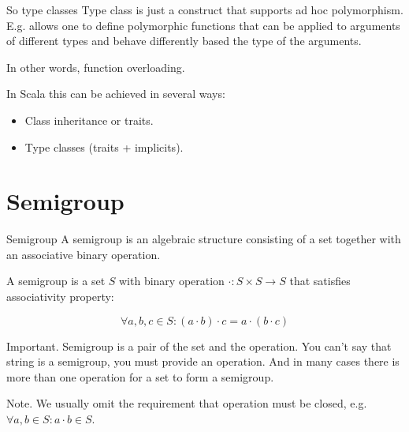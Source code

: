 \documentclass[presentation,aspectratio=169,smaller]{beamer}
\begin{document}
\begin{frame}[label={sec:org61835b7}]{So type classes}
Type class is just a construct that supports \alert{ad hoc polymorphism}. E.g. allows
one to define polymorphic functions that can be applied to arguments of
different types and behave differently based the type of the arguments.

In other words, function overloading.

In Scala this can be achieved in several ways:

\begin{itemize}
\item Class inheritance or traits.
\item Type classes (traits + implicits).
\end{itemize}
\end{frame}

\section*{Semigroup}
\label{sec:org990ad58}

\begin{frame}[label={sec:orgbe9a39c}]{Semigroup}
A semigroup is an algebraic structure consisting of a set together with an
associative binary operation.

\pause

A semigroup is a set \(S\) with binary operation \(\cdot : S \times S \rightarrow
S\) that satisfies associativity property:

$$\forall a, b, c \in S : (a \cdot b) \cdot c = a \cdot (b \cdot c)$$

\pause

\alert{Important}. Semigroup is a pair of the set and the operation. You can’t say
 that string is a semigroup, you must provide an operation. And in many cases
 there is more than one operation for a set to form a semigroup.

\pause

\alert{Note}. We usually omit the requirement that operation must be closed, e.g.
\(\forall a, b \in S : a \cdot b \in S\).
\end{frame}
\end{document}
